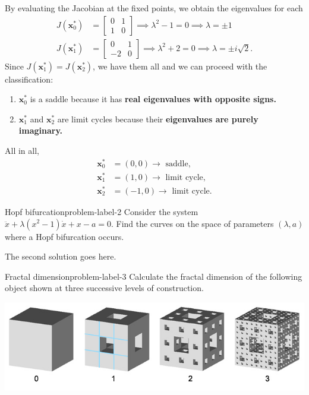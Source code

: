 By evaluating the Jacobian at the fixed points, we obtain the
eigenvalues for each
\[
    \begin{aligned}
        J(\textbf{x}_0^*) &= \begin{bmatrix}
            0 & 1\\
            1 & 0
        \end{bmatrix} \implies \lambda^2 - 1 = 0 \implies \lambda = \pm 1\\
        J(\textbf{x}_1^*) &= \begin{bmatrix}
            0 & 1\\
            -2 & 0
        \end{bmatrix} \implies \lambda^2 +2=0 \implies \lambda = \pm i\sqrt{2}.
    \end{aligned}
\]
Since $J(\textbf{x}_1^*) = J(\textbf{x}_2^*)$, we have them all and
we can proceed with the classification:

\begin{enumerate}[(1)] 
    \item $\textbf{x}_0^*$ is a saddle because it has \textbf{real eigenvalues
    with opposite signs.}
    \item $\textbf{x}_1^*$ and $\textbf{x}_2^*$ are limit cycles because
    their \textbf{eigenvalues are purely imaginary.}
\end{enumerate}

All in all,
\[
\boxed{
    \begin{aligned}
        \textbf{x}_0^* &= (0, 0) \rightarrow \text{ saddle},\\
        \textbf{x}_1^* &= (1, 0) \rightarrow \text{ limit cycle},\\
        \textbf{x}_2^* &= (-1, 0) \rightarrow \text{ limit cycle}.
    \end{aligned}
}
\]


\begin{problem}{Hopf bifurcation}{problem-label-2}
Consider the system $\ddot{x} + \lambda(x^2 - 1)\dot{x} + x - a = 0$.
Find the curves on the space of parameters $(\lambda, a)$ where a Hopf bifurcation occurs.
\end{problem}

The second solution goes here.

\begin{problem}{Fractal dimension}{problem-label-3}
Calculate the fractal dimension of the following object
shown at three successive levels of construction.

\begin{center}
    \includegraphics[scale=0.5]{images/cube_fractal.jpg}
\end{center}
\end{problem}

